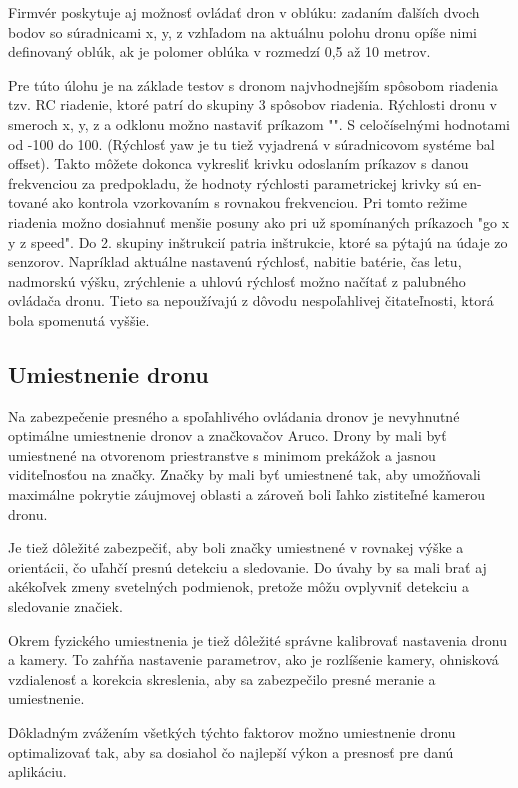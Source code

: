{\begin{figure}[ht!]
\end{figure}  
Firmvér poskytuje aj možnosť ovládať dron v oblúku: zadaním ďalších dvoch bodov so súradnicami x, y, z vzhľadom na aktuálnu polohu dronu opíše nimi definovaný oblúk, ak je polomer oblúka v rozmedzí 0,5 až 10 metrov.

Pre túto úlohu je na základe testov s dronom najvhodnejším spôsobom riadenia tzv. RC riadenie, ktoré patrí do skupiny 3 spôsobov riadenia. Rýchlosti dronu v smeroch x, y, z a odklonu možno nastaviť príkazom "". S celočíselnými hodnotami od -100 do 100. (Rýchlosť yaw je tu tiež vyjadrená v súradnicovom systéme bal offset). Takto môžete dokonca vykresliť krivku odoslaním príkazov s danou frekvenciou za predpokladu, že hodnoty rýchlosti parametrickej krivky sú en- tované ako kontrola vzorkovaním s rovnakou frekvenciou. Pri tomto režime riadenia možno dosiahnuť menšie posuny ako pri už spomínaných príkazoch "go x y z speed". 
Do 2. skupiny inštrukcií patria inštrukcie, ktoré sa pýtajú na údaje zo senzorov. Napríklad aktuálne nastavenú rýchlosť, nabitie batérie, čas letu, nadmorskú výšku, zrýchlenie a uhlovú rýchlosť možno načítať z palubného ovládača dronu. Tieto sa nepoužívajú z dôvodu nespoľahlivej čitateľnosti, ktorá bola spomenutá vyššie.

\subsection{Umiestnenie dronu}
Na zabezpečenie presného a spoľahlivého ovládania dronov je nevyhnutné optimálne umiestnenie dronov a značkovačov Aruco. Drony by mali byť umiestnené na otvorenom priestranstve s minimom prekážok a jasnou viditeľnosťou na značky. Značky by mali byť umiestnené tak, aby umožňovali maximálne pokrytie záujmovej oblasti a zároveň boli ľahko zistiteľné kamerou dronu.

Je tiež dôležité zabezpečiť, aby boli značky umiestnené v rovnakej výške a orientácii, čo uľahčí presnú detekciu a sledovanie. Do úvahy by sa mali brať aj akékoľvek zmeny svetelných podmienok, pretože môžu ovplyvniť detekciu a sledovanie značiek.

Okrem fyzického umiestnenia je tiež dôležité správne kalibrovať nastavenia dronu a kamery. To zahŕňa nastavenie parametrov, ako je rozlíšenie kamery, ohnisková vzdialenosť a korekcia skreslenia, aby sa zabezpečilo presné meranie a umiestnenie.

Dôkladným zvážením všetkých týchto faktorov možno umiestnenie dronu optimalizovať tak, aby sa dosiahol čo najlepší výkon a presnosť pre danú aplikáciu.

}
